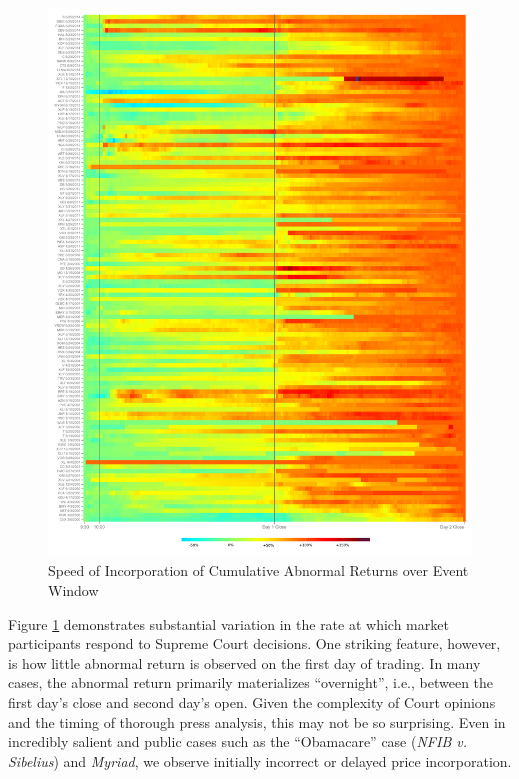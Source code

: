 \documentclass[preprint,12pt]{elsarticle}
\begin{document}
\begin{figure}[h!]
\centering
\includegraphics[scale=0.4]{figure7_abnormal_return_heatmap.pdf}
\caption{Speed of Incorporation of Cumulative Abnormal Returns over Event Window}
\label{abnormal_return_event_window}
\end{figure}


Figure \ref{abnormal_return_event_window} demonstrates substantial variation in the rate at which market participants respond to Supreme Court decisions.  One striking feature, however, is how little abnormal return is observed on the first day of trading.  In many cases, the abnormal return primarily materializes ``overnight'', i.e., between the first day's close and second day's open.  Given the complexity of Court opinions and the timing of thorough press analysis, this may not be so surprising.  Even in incredibly salient and public cases such as the ``Obamacare'' case (\textit{NFIB v. Sibelius})  and \textit{Myriad}, we observe initially incorrect or delayed price incorporation.
\end{document}
